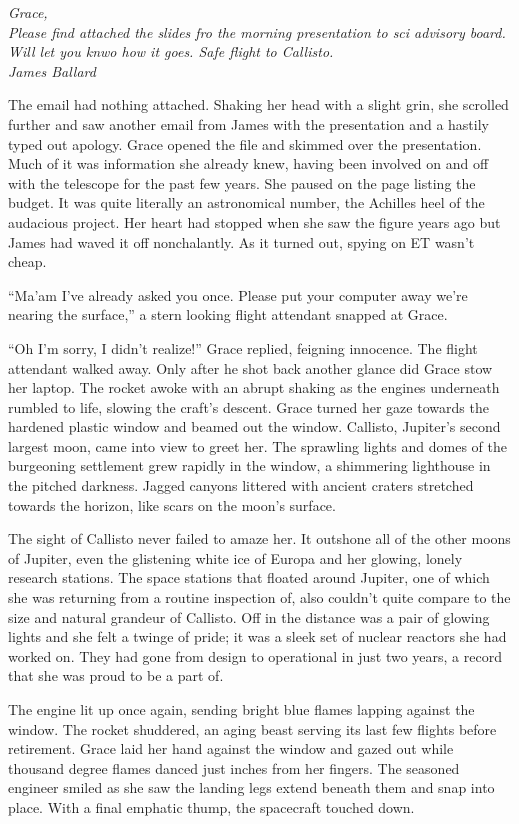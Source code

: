 \documentclass[12pt]{article} %
\begin{document}
\textit{Grace,\\
Please find attached the slides fro the morning presentation to sci advisory board. Will let you knwo how it goes. Safe flight to Callisto.\\
James Ballard}

The email had nothing attached. Shaking her head with a slight grin, she scrolled further and saw another email from James with the presentation and a hastily typed out apology. Grace opened the file and skimmed over the presentation. Much of it was information she already knew, having been involved on and off with the telescope for the past few years. She paused on the page listing the budget. It was quite literally an astronomical number, the Achilles heel of the audacious project. Her heart had stopped when she saw the figure years ago but James had waved it off nonchalantly. As it turned out, spying on ET wasn't cheap.

``Ma'am I've already asked you once. Please put your computer away we're nearing the surface,'' a stern looking flight attendant snapped at Grace.

``Oh I'm sorry, I didn't realize!'' Grace replied, feigning innocence. The flight attendant walked away. Only after he shot back another glance did Grace stow her laptop. The rocket awoke with an abrupt shaking as the engines underneath rumbled to life, slowing the craft's descent. Grace turned her gaze towards the hardened plastic window and beamed out the window. Callisto, Jupiter's second largest moon, came into view to greet her. The sprawling lights and domes of the burgeoning settlement grew rapidly in the window, a shimmering lighthouse in the pitched darkness. Jagged canyons littered with ancient craters stretched towards the horizon, like scars on the moon's surface. 

The sight of Callisto never failed to amaze her. It outshone all of the other moons of Jupiter, even the glistening white ice of Europa and her glowing, lonely research stations. The space stations that floated around Jupiter, one of which she was returning from a routine inspection of, also couldn't quite compare to the size and natural grandeur of Callisto. Off in the distance was a pair of glowing lights and she felt a twinge of pride; it was a sleek set of nuclear reactors she had worked on. They had gone from design to operational in just two years, a record that she was proud to be a part of. 

The engine lit up once again, sending bright blue flames lapping against the window. The rocket shuddered, an aging beast serving its last few flights before retirement. Grace laid her hand against the window and gazed out while thousand degree flames danced just inches from her fingers. The seasoned engineer smiled as she saw the landing legs extend beneath them and snap into place. With a final emphatic thump, the spacecraft touched down. 
\end{document}
